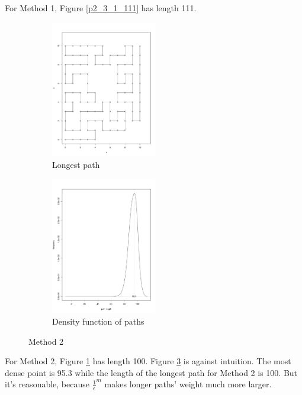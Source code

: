 \documentclass[11pt,english]{article}
\newcommand{\reffig}[1]{Figure \ref{#1}\hspace{2pt}}
\begin{document}
For Method 1, \reffig{p2_3_1_111} has length 111.  \\
\begin{figure}[H]
	\centering
	\begin{subfigure}[b]{0.475\textwidth}
		\centering
		\includegraphics[width=\textwidth, height=6cm]{p2_3_3_100.pdf}
		\caption{Longest path}\label{p2_3_3_100}
	\end{subfigure}
	\quad
	\begin{subfigure}[b]{0.475\textwidth}
		\centering
		\includegraphics[width=\textwidth, height=6cm]{p2_3_4.pdf}
		\caption{Density function of paths}\label{p2_3_4}
	\end{subfigure}
	\caption{Method 2}
\end{figure}
For Method 2, \reffig{p2_3_3_100} has length 100. \reffig{p2_3_4} is against intuition.  The most dense point is 95.3 while the length of the longest path for Method 2 is 100. But it's reasonable, because $\frac{1}{\epsilon}^m$ makes longer paths' weight much more larger. \\
\end{document}
